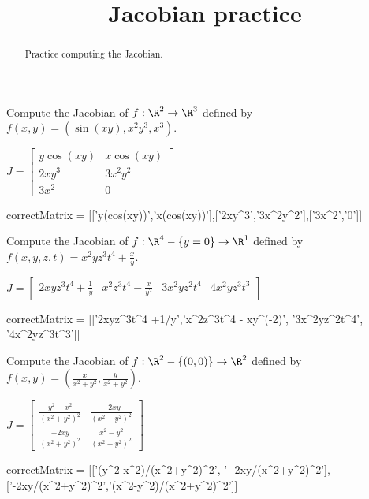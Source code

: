 \documentclass{ximera}
\title{Jacobian practice}
\begin{document}
	\begin{abstract}
          Practice computing the Jacobian.
	\end{abstract}\maketitle
	
	\begin{question}	
		Compute the Jacobian of $f:\R^2 \to \R^3$ defined by $f(x,y) = (\sin(xy),x^2y^3, x^3)$.
		\begin{solution}
		\begin{hint}
			\(J = \begin{bmatrix} y\cos(xy) & x\cos(xy) \\ 2xy^3 & 3x^2y^2 \\ 3x^2 & 0 \end{bmatrix}\)
		\end{hint}
		\begin{matrix-answer}[name=J]
			correctMatrix  = [['y(cos(xy))','x(cos(xy))'],['2xy^3','3x^2y^2'],['3x^2','0']]
		\end{matrix-answer}
		\end{solution}
	\end{question}
	
	\begin{question}	
		Compute the Jacobian of $f:\R^4 - \{y=0\} \to \R^1$ defined by $f(x,y,z,t) = x^2yz^3t^4+\frac{x}{y}$.
		\begin{solution}
		\begin{hint}
			\(J = \begin{bmatrix} 2xyz^3t^4 +\frac{1}{y} & x^2z^3t^4 - \frac{x}{y^2} & 3x^2yz^2t^4 & 4x^2yz^3t^3\end{bmatrix}\)
		\end{hint}
		\begin{matrix-answer}[name=J]
			correctMatrix  = [['2xyz^3t^4 +1/y','x^2z^3t^4 - xy^(-2)', '3x^2yz^2t^4', '4x^2yz^3t^3']]
		\end{matrix-answer}
		\end{solution}
	\end{question}
	
	\begin{question}	
		Compute the Jacobian of $f:\R^2 - \{(0,0)\} \to \R^2$ defined by $f(x,y) = (\frac{x}{x^2+y^2},\frac{y}{x^2+y^2})$.
		\begin{solution}
		\begin{hint}
			\(J = \begin{bmatrix} \frac{y^2-x^2}{(x^2+y^2)^2} & \frac{-2xy}{(x^2+y^2)^2} \\   \frac{-2xy}{(x^2+y^2)^2} & \frac{x^2-y^2}{(x^2+y^2)^2}  \end{bmatrix}\)
		\end{hint}
		\begin{matrix-answer}[name=J]
			correctMatrix  = [['(y^2-x^2)/(x^2+y^2)^2', ' -2xy/(x^2+y^2)^2'],['-2xy/(x^2+y^2)^2','(x^2-y^2)/(x^2+y^2)^2']]
		\end{matrix-answer}
		\end{solution}
	\end{question}
	
\end{document}
